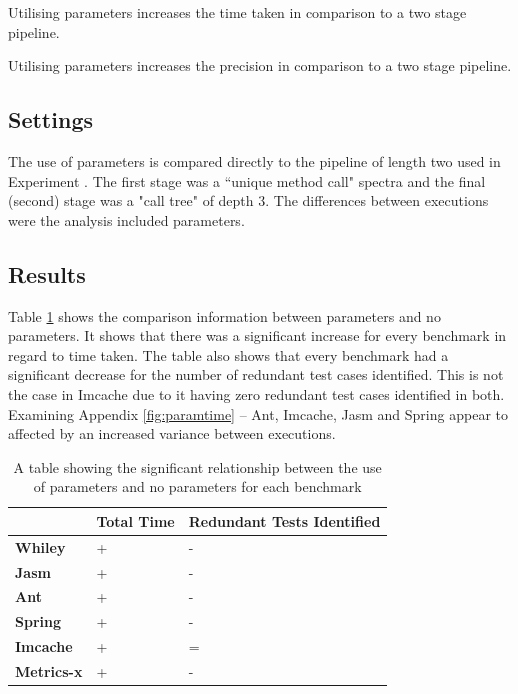 \begin{hyp}
Utilising parameters increases the time taken in comparison to a two stage pipeline.
\end{hyp}

\begin{hyp}
Utilising parameters increases the precision in comparison to a two stage pipeline.
\end{hyp}

\subsection{Settings}
The use of parameters is compared directly to the pipeline of length two used in Experiment . The first stage was a ``unique method call" spectra and the final (second) stage was a "call tree" of depth 3. The differences between executions were the analysis included parameters.

\subsection{Results}
 Table \ref{parametersig} shows the comparison information between parameters and no parameters. It shows that there was a significant increase for every benchmark in regard to time taken. The table also shows that every benchmark had a significant decrease for the number of redundant test cases identified. This is not the case in Imcache due to it having zero redundant test cases identified in both. Examining Appendix \ref{fig:paramtime} -- Ant, Imcache, Jasm and Spring appear to affected by an increased variance between executions.
 
\begin{table}[h]
\centering
\begin{tabular}{|l|l|l|}
\hline
{\bf }          & {\bf Total Time} & {\bf Redundant Tests Identified} \\ \hline
{\bf Whiley}    & +                & -                           \\ \hline
{\bf Jasm}      & +               & -                          \\ \hline
{\bf Ant}       & +                & -                           \\ \hline
{\bf Spring}    & +                & -                           \\ \hline
{\bf Imcache}   & +                & =                           \\ \hline
{\bf Metrics-x} & +                & -                           \\ \hline
\end{tabular}
\caption{A table showing the significant relationship between the use of parameters and no parameters for each benchmark}
\label{parametersig}
\end{table}

